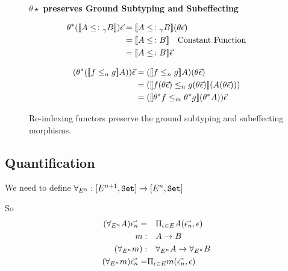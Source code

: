 \documentclass{report}
\begin{document}
\begin{figure}
    \begin{framed}
        \centering\textbf{$\theta\star$ preserves Ground Subtyping and Subeffecting}

        \begin{minipage}{.45\textwidth}
            \begin{align*}
                \theta\star(\deno{A\subtypeg B})\ev  & = \deno{A\subtypeg B}(\theta\ev)\\
                & = \deno{A\subtype B} \qt{Constant Function}\\
                & = \deno{A\subtype B} \ev\\
            \end{align*}
        \end{minipage}
        \quad
        \begin{minipage}{.45\textwidth}
            \begin{align*}
                (\theta\star(\dsen{f}{g} A))\ev & = (\dsen{f}{g} A)(\theta \ev)\\
                & = (\dsen{f(\theta\ev)}{g(\theta\ev)}(A(\theta\ev)))\\
                & = (\dsem{\theta\star f}{\theta\star g} (\theta\star A)) \ev\\
            \end{align*}
        \end{minipage}
    \end{framed}
    \caption{Re-indexing functors preserve the ground subtyping and subeffecting morphisms.}
    \label{PreservesSubtypingSubeffecting}
\end{figure}


\subsection{Quantification}
We need to define $\forall_{E^n}: [E^{n+1}, \texttt{Set}]\rightarrow[E^n, \texttt{Set}]$

So
\begin{align*}
    (\forall_{E^n} A)\vec{\epsilon_n} =&\quad \Pi_{\epsilon\in E} A(\vec{\epsilon_n}, \epsilon)\\
    m:&\quad A\rightarrow B\\
    (\forall_{E^n} m):&\quad \forall_{E^n} A\rightarrow \forall_{E^n} B\\
    (\forall_{E^n} m)\vec{\epsilon_n} =&\Pi_{\epsilon\in E} m(\vec{\epsilon_n}, \epsilon)\\
\end{align*}
\end{document}
